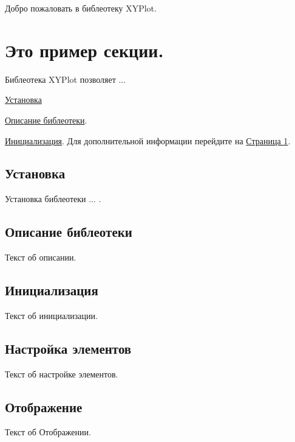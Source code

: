 Добро пожаловать в библеотеку X\-Y\-Plot. \hypertarget{index_sec}{}\section{Это пример секции.}\label{index_sec}
Библеотека X\-Y\-Plot позволяет ... \begin{DoxyItemize}
\item \hyperlink{index_subMain001}{Установка} \item \hyperlink{index_subMain002}{Описание библеотеки}. \item \hyperlink{index_subMain003}{Инициализация}. Для дополнительной информации перейдите на \hyperlink{page2}{Страница 1}. \end{DoxyItemize}
\hypertarget{index_subMain001}{}\subsection{Установка}\label{index_subMain001}
Установка библеотеки ... . \hypertarget{index_subMain002}{}\subsection{Описание библеотеки}\label{index_subMain002}
Текст об описании. \hypertarget{index_subMain003}{}\subsection{Инициализация}\label{index_subMain003}
Текст об инициализации. \hypertarget{index_subMain004}{}\subsection{Настройка элементов}\label{index_subMain004}
Текст об настройке элементов. \hypertarget{index_subMain005}{}\subsection{Отображение}\label{index_subMain005}
Текст об Отображении. 